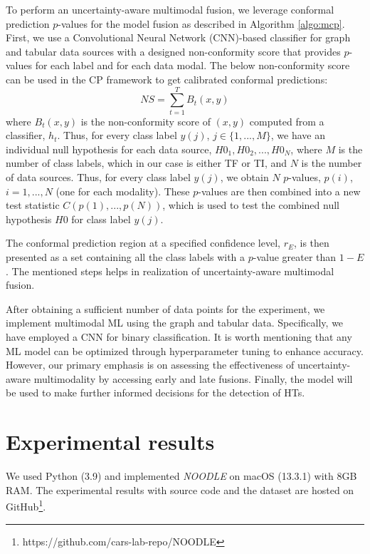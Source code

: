 To perform an uncertainty-aware multimodal fusion, we leverage conformal prediction $p$-values for the model fusion as described in Algorithm \ref{algo:mcp}. First, we use a Convolutional Neural Network (CNN)-based classifier for graph and tabular data sources with a designed non-conformity score that provides $p$-values for each label and for each data modal. The below non-conformity score can be used in the CP framework to get calibrated conformal predictions:
\begin{equation}
NS = \sum_{t=1}^T B_t(x, y)
\end{equation}
where \(B_t(x, y)\) is the non-conformity score of \((x, y)\) computed from a classifier, \(h_t\). Thus, for every class label \(y(j)\), \(j \in \{1, ..., M\}\), we have an individual null hypothesis for each data source, \(H0_1, H0_2, ..., H0_N\), where \(M\) is the number of class labels, which in our case is either TF or TI, and \(N\) is the number of data sources. Thus, for every class label \(y(j)\), we obtain \(N\) $p$-values, \(p(i)\), \(i = 1,..., N\) (one for each modality). These $p$-values are then combined into a new test statistic \(C(p(1), ..., p(N))\), which is used to test the combined null hypothesis \(H0\) for class label \(y(j)\). 

The conformal prediction region at a specified confidence level, \(r_E\), is then presented as a set containing all the class labels with a $p$-value greater than \(1-E\). The mentioned steps helps in realization of uncertainty-aware multimodal fusion.

After obtaining a sufficient number of data points for the experiment, we implement multimodal ML using the graph and tabular data. Specifically, we have employed a CNN for binary classification. It is worth mentioning that any ML model can be optimized through hyperparameter tuning to enhance accuracy. However, our primary emphasis is on assessing the effectiveness of uncertainty-aware multimodality by accessing early and late fusions. Finally, the model will be used to make further informed decisions for the detection of HTs.


\section*{Experimental results}
\label{sec:Results}
We used Python (3.9) and implemented \textit{NOODLE} on macOS (13.3.1) with 8GB RAM. The experimental results with source code and the dataset are hosted on GitHub\footnote{https://github.com/cars-lab-repo/NOODLE}.

